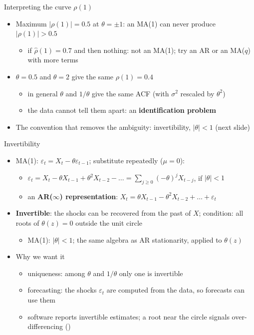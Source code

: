 \begin{frame}{Interpreting the curve $\rho(1)$}
\itemsize{\small}
\begin{itemize}
    \item Maximum $|\rho(1)| = 0.5$ at $\theta = \pm 1$: an MA(1) can never produce $|\rho(1)| > 0.5$
    \begin{itemize}
        \item if $\hat\rho(1) = 0.7$ and then nothing: not an MA(1); try an AR or an MA($q$) with more terms
    \end{itemize}
    \item $\theta = 0.5$ and $\theta = 2$ give the same $\rho(1) = 0.4$
    \begin{itemize}
        \item in general $\theta$ and $1/\theta$ give the same ACF (with $\sigma^2$ rescaled by $\theta^2$)
        \item the data cannot tell them apart: an \textbf{identification problem}
    \end{itemize}
    \item The convention that removes the ambiguity: invertibility, $|\theta| < 1$ (next slide)
\end{itemize}
\end{frame}

\begin{frame}{Invertibility}
\itemsize{\small}
\begin{itemize}
    \item MA(1): $\varepsilon_t = X_t - \theta\varepsilon_{t-1}$; substitute repeatedly ($\mu = 0$):
    \begin{itemize}
        \item $\varepsilon_t = X_t - \theta X_{t-1} + \theta^2X_{t-2} - \dots = \sum_{j \ge 0}(-\theta)^jX_{t-j}$, if $|\theta| < 1$
        \item an \textbf{AR($\infty$) representation}: $X_t = \theta X_{t-1} - \theta^2X_{t-2} + \dots + \varepsilon_t$
    \end{itemize}
    \item \textbf{Invertible}: the shocks can be recovered from the past of $X$; condition: all roots of $\theta(z) = 0$ outside the unit circle
    \begin{itemize}
        \item MA(1): $|\theta| < 1$; the same algebra as AR stationarity, applied to $\theta(z)$
    \end{itemize}
    \item Why we want it
    \begin{itemize}
        \item uniqueness: among $\theta$ and $1/\theta$ only one is invertible
        \item forecasting: the shocks $\varepsilon_t$ are computed from the data, so forecasts can use them
        \item software reports invertible estimates; a root near the circle signals over-differencing ()
    \end{itemize}
\end{itemize}
\end{frame}


